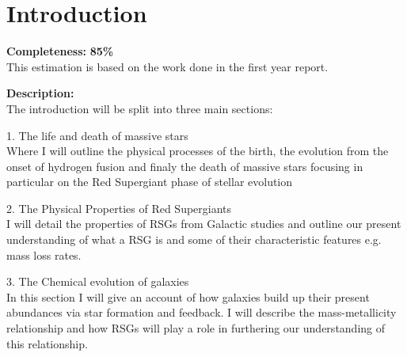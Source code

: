 \chapter{Introduction}

\textbf{Completeness:} \textbf{85\%} \\
This estimation is based on the work done in the first year report.

\textbf{Description:} \\
The introduction will be split into three main sections:

1. The life and death of massive stars\\
Where I will outline the physical processes of the birth,
the evolution from the onset of hydrogen fusion and finaly the death of massive stars focusing in particular on the Red Supergiant phase of stellar evolution

2. The Physical Properties of Red Supergiants\\
I will detail the properties of RSGs from Galactic studies and outline our
present understanding of what a RSG is and some of their characteristic features
e.g. mass loss rates.

3. The Chemical evolution of galaxies\\
In this section I will give an account of how galaxies build up their present
abundances via star formation and feedback.
I will describe the mass-metallicity relationship and how RSGs will play a role
in furthering our understanding of this relationship.



